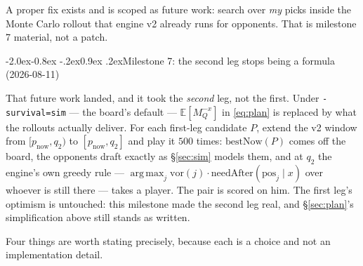 \documentclass[10pt,a4paper]{article}
\makeatletter
\theoremstyle{plain}
\theoremstyle{definition}
\theoremstyle{remark}
\newcommand{\code}[1]{\texttt{\small #1}}
\renewcommand\subsection{\@startsection{subsection}{2}{\z@}%
  {-2.0ex\@plus -0.8ex \@minus -.2ex}{0.9ex \@plus .2ex}{\normalfont\large\bfseries}}
\makeatother
\begin{document}
A proper fix exists and is scoped as future work: search over \emph{my} picks inside the
Monte Carlo rollout that engine v2 already runs for opponents. That is milestone 7
material, not a patch.

\subsection{Milestone 7: the second leg stops being a formula (2026-08-11)}
\label{sec:plancond}

That future work landed, and it took the \emph{second} leg, not the first. Under
\code{-survival=sim} --- the board's default --- $\mathbb{E}[M_Q^{-x}]$ in
\eqref{eq:plan} is replaced by what the rollouts actually deliver. For each first-leg
candidate $P$, extend the v2 window from $[p_{\text{now}}, q_2)$ to
$[p_{\text{now}}, q_2]$ and play it $500$ times: $\mathrm{bestNow}(P)$ comes off the
board, the opponents draft exactly as \S\ref{sec:sim} models them, and at $q_2$ the
engine's own greedy rule --- $\operatorname*{arg\,max}_j \mathrm{vor}(j)\cdot\mathrm{needAfter}(\mathrm{pos}_j
\mid x)$ over whoever is still there --- takes a player. The pair is scored on him. The
first leg's optimism is untouched: this milestone made the second leg real, and
\S\ref{sec:plan}'s simplification above still stands as written.

Four things are worth stating precisely, because each is a choice and not an
implementation detail.
\end{document}
